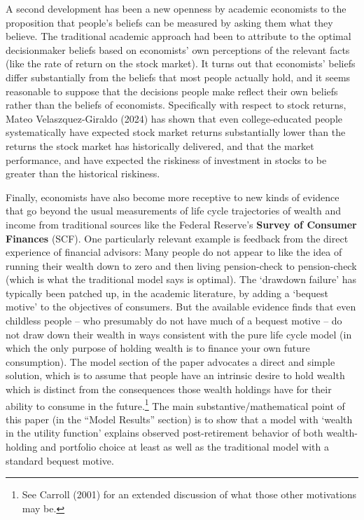 \documentclass{article}
\begin{document}
A second development has been a new openness by academic economists to the proposition that people's beliefs can be measured by asking them what they believe. The traditional academic approach had been to attribute to the optimal decisionmaker beliefs based on economists' own perceptions of the relevant facts (like the rate of return on the stock market). It turns out that economists' beliefs differ substantially from the beliefs that most people actually hold, and it seems reasonable to suppose that the decisions people make reflect their own beliefs rather than the beliefs of economists. Specifically with respect to stock returns, Mateo Velaszquez-Giraldo (2024) has shown that even college-educated people systematically have expected stock market returns substantially lower than the returns the stock market has historically delivered, and that the market performance, and have expected the riskiness of investment in stocks to be greater than the historical riskiness.

Finally, economists have also become more receptive to new kinds of evidence that go beyond the usual measurements of life cycle trajectories of wealth and income from traditional sources like the Federal Reserve's \textbf{Survey of Consumer Finances} (SCF). One particularly relevant example is feedback from the direct experience of financial advisors: Many people do not appear to like the idea of running their wealth down to zero and then living pension-check to pension-check (which is what the traditional model says is optimal). The `drawdown failure' has typically been patched up, in the academic literature, by adding a `bequest motive' to the objectives of consumers. But the available evidence finds that even childless people -- who presumably do not have much of a bequest motive -- do not draw down their wealth in ways consistent with the pure life cycle model (in which the only purpose of holding wealth is to finance your own future consumption). The model section of the paper advocates a direct and simple solution, which is to assume that people have an intrinsic desire to hold wealth which is distinct from the consequences those wealth holdings have for their ability to consume in the future.\footnote{See Carroll (2001) for an extended discussion of what those other motivations may be.} The main substantive/mathematical point of this paper (in the ``Model Results'' section) is to show that a model with `wealth in the utility function' explains observed post-retirement behavior of both wealth-holding and portfolio choice at least as well as the traditional model with a standard bequest motive.
\end{document}
